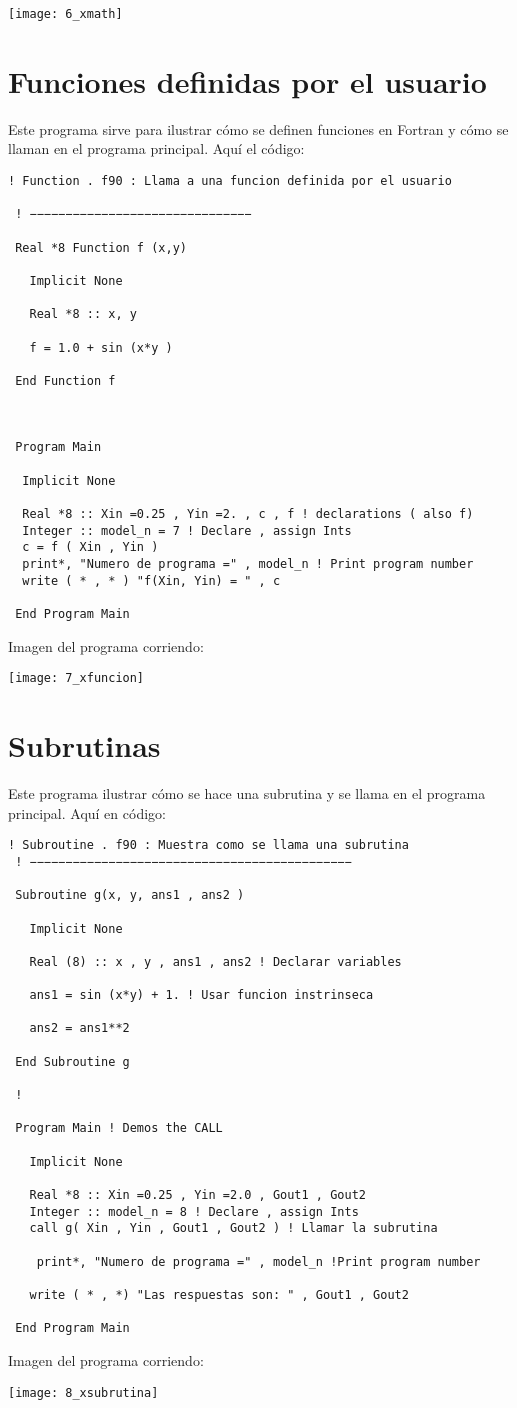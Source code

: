 \documentclass[notitlepage,12pt]{article}
\begin{document}
\texttt{[image: 6\_xmath]}

\section{Funciones definidas por el usuario}
Este programa sirve para ilustrar c\'omo se definen funciones
en Fortran y c\'omo se llaman en el programa principal.
Aqu\'i el c\'odigo:
\begin{verbatim}
! Function . f90 : Llama a una funcion definida por el usuario

 ! −−−−−−−−−−−−−−−−−−−−−−−−−−−−−−−

 Real *8 Function f (x,y)

   Implicit None

   Real *8 :: x, y

   f = 1.0 + sin (x*y )

 End Function f

 

 Program Main

  Implicit None

  Real *8 :: Xin =0.25 , Yin =2. , c , f ! declarations ( also f)
  Integer :: model_n = 7 ! Declare , assign Ints
  c = f ( Xin , Yin )
  print*, "Numero de programa =" , model_n ! Print program number
  write ( * , * ) "f(Xin, Yin) = " , c

 End Program Main 
\end{verbatim}
Imagen del programa corriendo:

\texttt{[image: 7\_xfuncion]}

\section{Subrutinas}
Este programa ilustrar c\'omo se hace una subrutina
y se llama en el programa principal.
Aqu\'i en c\'odigo:
\begin{verbatim}
! Subroutine . f90 : Muestra como se llama una subrutina
 ! −−−−−−−−−−−−−−−−−−−−−−−−−−−−−−−−−−−−−−−−−−−−−

 Subroutine g(x, y, ans1 , ans2 )

   Implicit None

   Real (8) :: x , y , ans1 , ans2 ! Declarar variables

   ans1 = sin (x*y) + 1. ! Usar funcion instrinseca

   ans2 = ans1**2

 End Subroutine g

 !

 Program Main ! Demos the CALL

   Implicit None

   Real *8 :: Xin =0.25 , Yin =2.0 , Gout1 , Gout2
   Integer :: model_n = 8 ! Declare , assign Ints
   call g( Xin , Yin , Gout1 , Gout2 ) ! Llamar la subrutina
   
    print*, "Numero de programa =" , model_n !Print program number

   write ( * , *) "Las respuestas son: " , Gout1 , Gout2

 End Program Main
\end{verbatim}
Imagen del programa corriendo:

\texttt{[image: 8\_xsubrutina]}






 
\end{document}
